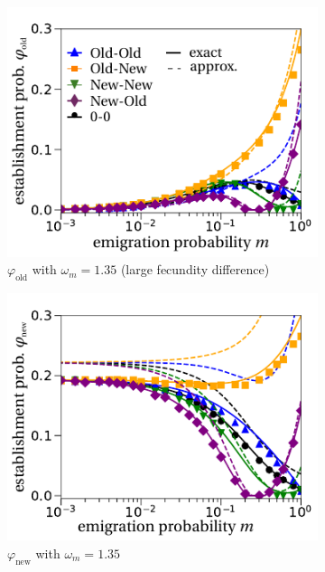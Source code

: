 \documentclass[a4paper,11pt]{scrartcl}
\begin{document}
\begin{figure}[h!]
	\centering
	\begin{subfigure}{.5\textwidth}
  		\centering
  		\includegraphics[width=\linewidth]{figS6a.pdf}
  		\caption{$\varphi_{\text{old}}$ with $\omega_m=1.35$ (large fecundity difference)}
	\end{subfigure}%
	\begin{subfigure}{.5\textwidth}
 		 \centering
 		 \includegraphics[width=\linewidth]{figS6b.pdf}
  	\caption{$\varphi_{\text{new}}$ with $\omega_m=1.35$}
	\end{subfigure}
	\begin{subfigure}{.5\textwidth}

\end{subfigure}
\end{figure}
\end{document}
